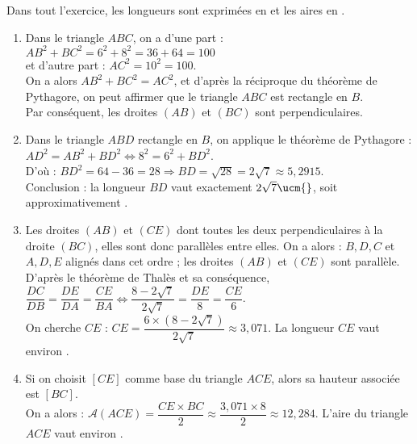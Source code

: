    Dans tout l'exercice, les longueurs sont exprimées en \ucm{} et les aires en \ucmq{}. \\
   \begin{enumerate}
      \item Dans le triangle $ABC$, on a d'une part : $AB^2+BC^2 =6^2+8^2 =36+64 =100$ \\
         et d'autre part : $AC^2 =10^2 =100$. \\
         On a alors $AB^2+BC^2 =AC^2$, et d'après la réciproque du théorème de Pythagore, on peut affirmer que le triangle $ABC$ est rectangle en $B$. \\
         Par conséquent, {\blue les droites $(AB)$ et $(BC)$ sont perpendiculaires}.
      \item Dans le triangle $ABD$ rectangle en $B$, on applique le théorème de Pythagore : \\
         $AD^2 =AB^2+BD^2 \iff 8^2 =6^2+BD^2$. \\
         D'où : $BD^2 =64-36 =28 \Longrightarrow BD =\sqrt{28} =2\sqrt7 \approx5,2915$. \\
         Conclusion : {\blue la longueur $BD$ vaut exactement $2\sqrt7\ucm{}$, soit approximativement }.
      \item Les droites $(AB)$ et $(CE)$ dont toutes les deux perpendiculaires à la droite $(BC)$, elles sont donc parallèles entre elles. On a alors : $B, D, C$ et $A, D, E$ alignés dans cet ordre ; les droites $(AB)$ et $(CE)$ sont parallèle. \\ [1mm]
         D'après le théorème de Thalès et sa conséquence, $\dfrac{DC}{DB} =\dfrac{DE}{DA} =\dfrac{CE}{BA} \iff \dfrac{8-2\sqrt7}{2\sqrt7} =\dfrac{DE}{8} =\dfrac{CE}{6}$. \\
         On cherche $CE$ : $CE =\dfrac{6\times(8-2\sqrt7)}{2\sqrt7} \approx3,071$. {\blue La longueur $CE$ vaut environ }. \smallskip
      \item Si on choisit $[CE]$ comme base du triangle $ACE$, alors sa hauteur associée est $[BC]$. \\ [1mm]
         On a alors : $\mathcal{A}(ACE) =\dfrac{CE\times BC}{2} \approx\dfrac{3,071\times8}{2} \approx12,284$. {\blue L'aire du triangle $ACE$ vaut environ }.
   \end{enumerate}
